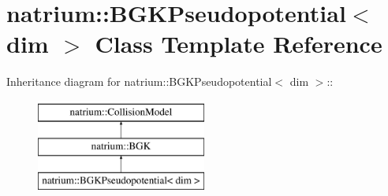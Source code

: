 \hypertarget{classnatrium_1_1BGKPseudopotential}{
\section{natrium::BGKPseudopotential$<$ dim $>$ Class Template Reference}
\label{classnatrium_1_1BGKPseudopotential}
}
Inheritance diagram for natrium::BGKPseudopotential$<$ dim $>$::\begin{figure}[H]
\begin{center}
\leavevmode
\includegraphics[height=3cm]{classnatrium_1_1BGKPseudopotential}
\end{center}
\end{figure}
